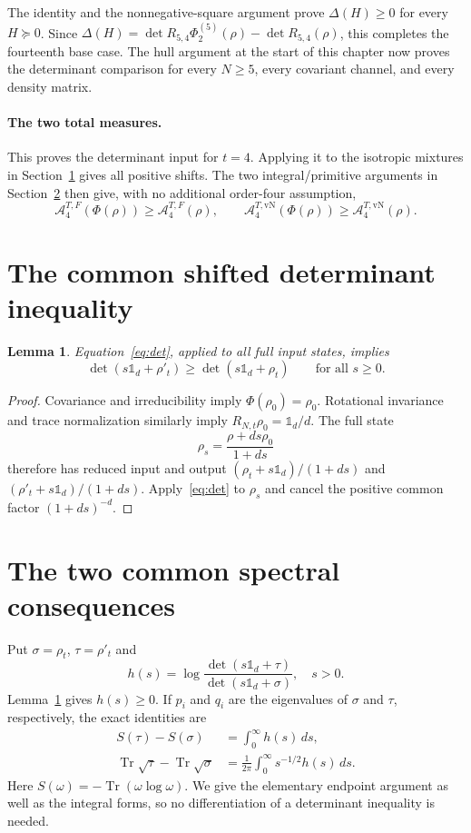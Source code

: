 \documentclass[11pt,a4paper]{article}
\newcommand{\A}{\mathcal A}
\newcommand{\Tr}{\operatorname{Tr}}
\newcommand{\id}{\mathds{1}}
\newtheorem{lemma}{Lemma}
\begin{document}
The identity and the nonnegative-square argument prove
$\Delta(H)\ge0$ for every $H\succeq0$. Since
$\Delta(H)=\det R_{5,4}\Phi_2^{(5)}(\rho)-\det R_{5,4}(\rho)$,
this completes the fourteenth base case. The hull argument at the
start of this chapter now proves the determinant comparison for every
$N\ge5$, every covariant channel, and every density matrix.

\paragraph{The two total measures.}
This proves the determinant input for $t=4$. Applying it to the isotropic
mixtures in Section~\ref{sec:shift} gives all positive shifts. The two
integral/primitive arguments in Section~\ref{sec:spectral} then give,
with no additional order-four assumption,
\[
 \A_4^{T,F}(\Phi(\rho))\ge\A_4^{T,F}(\rho),\qquad
 \A_4^{T,\mathrm{vN}}(\Phi(\rho))\ge\A_4^{T,\mathrm{vN}}(\rho).
\]

\clearpage\section{The common shifted determinant inequality}\label{sec:shift}
\begin{lemma}\label{lem:shift}
Equation~\eqref{eq:det}, applied to all full input states, implies
\[
 \det(s\id_d+\rho'_t)\ge\det(s\id_d+\rho_t)
 \qquad\text{for all }s\ge0.
\]
\end{lemma}
\begin{proof}
Covariance and irreducibility imply $\Phi(\rho_0)=\rho_0$.
Rotational invariance and trace normalization similarly imply
$R_{N,t}\rho_0=\id_d/d$.
The full state
\[
 \rho_s=\frac{\rho+ds\rho_0}{1+ds}
\]
therefore has reduced input and output
$(\rho_t+s\id_d)/(1+ds)$ and $(\rho'_t+s\id_d)/(1+ds)$.
Apply~\eqref{eq:det} to $\rho_s$ and cancel the positive common
factor $(1+ds)^{-d}$.
\end{proof}

\section{The two common spectral consequences}\label{sec:spectral}
Put $\sigma=\rho_t$, $\tau=\rho'_t$ and
\[
 h(s)=\log\frac{\det(s\id_d+\tau)}{\det(s\id_d+\sigma)},\quad s>0.
\]
Lemma~\ref{lem:shift} gives $h(s)\ge0$. If $p_i$ and $q_i$ are the
eigenvalues of $\sigma$ and $\tau$, respectively, the exact identities are
\begin{align}
 S(\tau)-S(\sigma)&=\int_0^\infty h(s)\,ds,\label{eq:entropyint}\\
 \Tr\sqrt\tau-\Tr\sqrt\sigma
 &=\frac1{2\pi}\int_0^\infty s^{-1/2}h(s)\,ds.\label{eq:sqrtint}
\end{align}
Here $S(\omega)=-\Tr(\omega\log\omega)$.
We give the elementary endpoint argument as well as the integral forms,
so no differentiation of a determinant inequality is needed.
\end{document}
